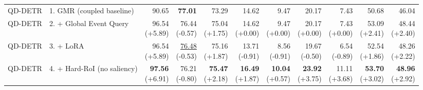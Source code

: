\documentclass{article}
\begin{document}
{\begin{tabular}{llrrrrrrrrr}
\midrule
QD-DETR & 1. GMR (coupled baseline) & 90.65 & \textbf{77.01} & 73.29 & 14.62 & 9.47 & 20.17 & 7.43 & 50.68 & 46.04 \\
QD-DETR & 2. + Global Event Query & \shortstack{96.54 \\ {\scriptsize (+5.89)}} & \shortstack{76.44 \\ {\scriptsize (-0.57)}} & \shortstack{75.04 \\ {\scriptsize (+1.75)}} & \shortstack{14.62 \\ {\scriptsize (+0.00)}} & \shortstack{9.47 \\ {\scriptsize (+0.00)}} & \shortstack{20.17 \\ {\scriptsize (+0.00)}} & \shortstack{7.43 \\ {\scriptsize (+0.00)}} & \shortstack{53.09 \\ {\scriptsize (+2.41)}} & \shortstack{48.44 \\ {\scriptsize (+2.40)}} \\
QD-DETR & 3. + LoRA & \shortstack{96.54 \\ {\scriptsize (+5.89)}} & \shortstack{\underline{76.48} \\ {\scriptsize (-0.53)}} & \shortstack{75.16 \\ {\scriptsize (+1.87)}} & \shortstack{13.71 \\ {\scriptsize (-0.91)}} & \shortstack{8.56 \\ {\scriptsize (-0.91)}} & \shortstack{19.67 \\ {\scriptsize (-0.50)}} & \shortstack{6.54 \\ {\scriptsize (-0.89)}} & \shortstack{52.54 \\ {\scriptsize (+1.86)}} & \shortstack{48.26 \\ {\scriptsize (+2.22)}} \\
QD-DETR & 4. + Hard-RoI (no saliency) & \shortstack{\textbf{97.56} \\ {\scriptsize (+6.91)}} & \shortstack{76.21 \\ {\scriptsize (-0.80)}} & \shortstack{\textbf{75.47} \\ {\scriptsize (+2.18)}} & \shortstack{\textbf{16.49} \\ {\scriptsize (+1.87)}} & \shortstack{\textbf{10.04} \\ {\scriptsize (+0.57)}} & \shortstack{\textbf{23.92} \\ {\scriptsize (+3.75)}} & \shortstack{11.11 \\ {\scriptsize (+3.68)}} & \shortstack{\textbf{53.70} \\ {\scriptsize (+3.02)}} & \shortstack{\textbf{48.96} \\ {\scriptsize (+2.92)}} \\

\end{tabular}}
\end{document}
